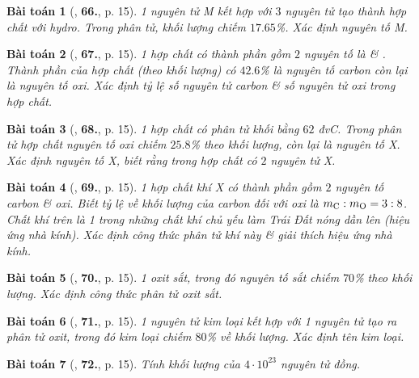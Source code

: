 \documentclass{article}
\numberwithin{equation}{section}
\newtheorem{baitoan}{Bài toán}[section]
\begin{document}
\begin{baitoan}[\cite{An2011}, \textbf{66.}, p. 15]
	1 nguyên tử M kết hợp với $3$ nguyên tử  tạo thành hợp chất với hydro. Trong phân tử, khối lượng  chiếm $17.65$\%. Xác định nguyên tố M.
\end{baitoan}

\begin{baitoan}[\cite{An2011}, \textbf{67.}, p. 15]
	1 hợp chất có thành phần gồm $2$ nguyên tố là  \& . Thành phần của hợp chất (theo khối lượng) có $42.6$\% là nguyên tố carbon còn lại là nguyên tố oxi. Xác định tỷ lệ số nguyên tử carbon \& số nguyên tử oxi trong hợp chất.
\end{baitoan}

\begin{baitoan}[\cite{An2011}, \textbf{68.}, p. 15]
	1 hợp chất có phân tử khối bằng $62$ đvC. Trong phân tử hợp chất nguyên tố oxi chiếm $25.8$\% theo khối lượng, còn lại là nguyên tố X. Xác định nguyên tố X, biết rằng trong hợp chất có $2$ nguyên tử X.
\end{baitoan}

\begin{baitoan}[\cite{An2011}, \textbf{69.}, p. 15]
	1 hợp chất khí X có thành phần gồm $2$ nguyên tố carbon \& oxi. Biết tỷ lệ về khối lượng của carbon đối với oxi là $m_{\rm C}:m_{\rm O} = 3:8$. Chất khí trên là 1 trong những chất khí chủ yếu làm Trái Đất nóng dần lên (hiệu ứng nhà kính). Xác định công thức phân tử khí này \& giải thích hiệu ứng nhà kính.
\end{baitoan}

\begin{baitoan}[\cite{An2011}, \textbf{70.}, p. 15]
	1 oxit sắt, trong đó nguyên tố sắt chiếm $70$\% theo khối lượng. Xác định công thức phân tử oxit sắt.
\end{baitoan}

\begin{baitoan}[\cite{An2011}, \textbf{71.}, p. 15]
	1 nguyên tử kim loại kết hợp với 1 nguyên tử  tạo ra phân tử oxit, trong đó kim loại chiếm $80$\% về khối lượng. Xác định tên kim loại.
\end{baitoan}

\begin{baitoan}[\cite{An2011}, \textbf{72.}, p. 15]
	Tính khối lượng của $4\cdot 10^{23}$ nguyên tử đồng.
\end{baitoan}
\end{document}
